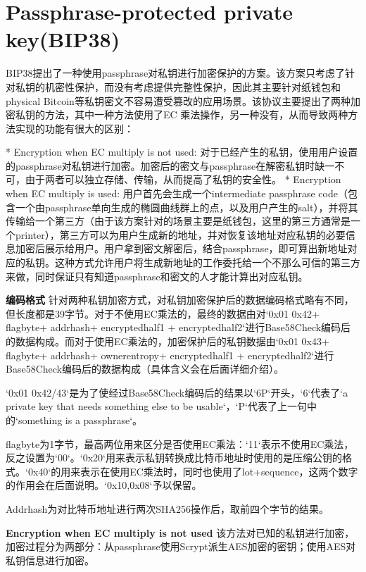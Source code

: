 \section{Passphrase-protected private key(BIP38)}
BIP38提出了一种使用passphrase对私钥进行加密保护的方案。该方案只考虑了针对私钥的机密性保护，而没有考虑提供完整性保护，因此其主要针对纸钱包和physical Bitcoin等私钥密文不容易遭受篡改的应用场景。该协议主要提出了两种加密私钥的方法，其中一种方法使用了EC 乘法操作，另一种没有，从而导致两种方法实现的功能有很大的区别：

* Encryption when EC multiply is not used: 对于已经产生的私钥，使用用户设置的passphrase对私钥进行加密。加密后的密文与passphrase在解密私钥时缺一不可，由于两者可以独立存储、传输，从而提高了私钥的安全性。
* Encryption when EC multiply is used: 用户首先会生成一个intermediate passphrase code（包含一个由passphrase单向生成的椭圆曲线群上的点，以及用户产生的salt），并将其传输给一个第三方（由于该方案针对的场景主要是纸钱包，这里的第三方通常是一个printer），第三方可以为用户生成新的地址，并对恢复该地址对应私钥的必要信息加密后展示给用户。用户拿到密文解密后，结合passphrase，即可算出新地址对应的私钥。这种方式允许用户将生成新地址的工作委托给一个不那么可信的第三方来做，同时保证只有知道passphrase和密文的人才能计算出对应私钥。



\textbf{ 编码格式}
针对两种私钥加密方式，对私钥加密保护后的数据编码格式略有不同，但长度都是39字节。对于不使用EC乘法的，最终的数据由对`0x01 0x42+ flagbyte+ addrhash+ encryptedhalf1 + encryptedhalf2`进行Base58Check编码后的数据构成。而对于使用EC乘法的，加密保护后的私钥数据由`0x01 0x43+ flagbyte+ addrhash+ ownerentropy+ encryptedhalf1 + encryptedhalf2`进行Base58Check编码后的数据构成（具体含义会在后面详细介绍）。

`0x01 0x42/43`是为了使经过Base58Check编码后的结果以`6P`开头，`6`代表了`a private key that needs something else to be usable`，`P`代表了上一句中的`something is a passphrase`。

flagbyte为1字节，最高两位用来区分是否使用EC乘法：`11`表示不使用EC乘法，反之设置为`00`。`0x20`用来表示私钥转换成比特币地址时使用的是压缩公钥的格式。`0x40`的用来表示在使用EC乘法时，同时也使用了lot+sequence，这两个数字的作用会在后面说明。`0x10,0x08`予以保留。

Addrhash为对比特币地址进行两次SHA256操作后，取前四个字节的结果。

\textbf{Encryption when EC multiply is not used}
该方法对已知的私钥进行加密，加密过程分为两部分：从passphrase使用Scrypt派生AES加密的密钥；使用AES对私钥信息进行加密。


